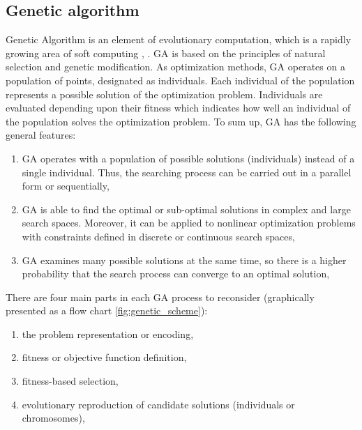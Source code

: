\subsection{Genetic algorithm}
\label{cha:Genetic_algorithm}
Genetic Algorithm is an element of evolutionary computation, which is a 
rapidly growing area of soft computing \cite{bib42}, \cite{bib43}. GA is based on the principles of
natural selection and genetic modification. As optimization methods, GA 
operates on a population of points, designated as individuals. Each 
individual of the population represents a possible solution of the 
optimization problem. Individuals are evaluated depending upon their 
fitness which indicates how well an individual of the population solves 
the optimization problem. To sum up, GA has the following general features:
\begin{enumerate}
    \item GA operates with a population of possible solutions (individuals) 
        instead of a single individual. Thus, the searching process can be 
        carried out in a parallel form or sequentially,
    \item GA is able to find the optimal or sub-optimal solutions in complex
        and large search spaces. Moreover, it can be applied to nonlinear 
        optimization problems with constraints defined in discrete or continuous 
        search spaces,
    \item GA examines many possible solutions at the same time, so there is a 
        higher probability that the search process can converge to an optimal
        solution,
\end{enumerate}
There are four main parts in each GA process to reconsider (graphically
presented as a flow chart \ref{fig:genetic_scheme}):
\begin{enumerate}
    \item the problem representation or encoding,
    \item fitness or objective function definition,
    \item fitness-based selection,
    \item evolutionary reproduction of candidate solutions (individuals or
        chromosomes),
\end{enumerate}
